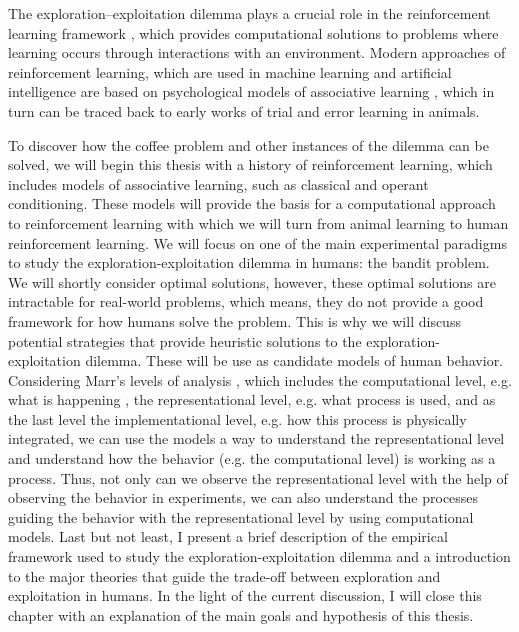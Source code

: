 
The exploration--exploitation dilemma plays a crucial role in the reinforcement learning framework \citep{sutton2018reinforcement}, which provides computational solutions to problems where learning occurs through interactions with an environment. Modern approaches of reinforcement learning, which are used in machine learning and artificial intelligence are based on psychological models of associative learning \citep{sutton2018reinforcement}, which in turn can be traced back to early works of trial and error learning in animals. 

To discover how the coffee problem and other instances of the dilemma can be solved, we will begin this thesis with a history of reinforcement learning, which includes models of associative learning, such as classical and operant conditioning.
These models will provide the basis for a computational approach to reinforcement learning with which we will turn from animal learning to human reinforcement learning. We will focus on one of the main experimental paradigms to study the exploration-exploitation dilemma in humans: the bandit problem. We will shortly consider optimal solutions, however, these optimal solutions are intractable for real-world problems, which means, they do not provide a good framework for how humans solve the problem. 
This is why we will discuss potential strategies that provide heuristic solutions to the exploration-exploitation dilemma. These will be use as candidate models of human behavior. Considering Marr's levels of analysis \citep{dawson1998understanding}, which includes the computational level, e.g. what is happening , the representational level, e.g. what process is used, and as the last level the implementational level, e.g. how this process is physically integrated, we can use the models a way to understand the representational level and understand how the behavior (e.g. the computational level) is working as a process. Thus, not only can we observe the representational level with the help of observing the behavior in experiments, we can also understand the processes guiding the behavior with the representational level by using computational models. 
Last but not least, I present a brief description of the empirical framework used to study the exploration-exploitation dilemma and a introduction to the major theories that guide the trade-off between exploration and exploitation in humans. In the light of the current discussion, I will close this chapter with an explanation of the main goals and hypothesis of this thesis. 

